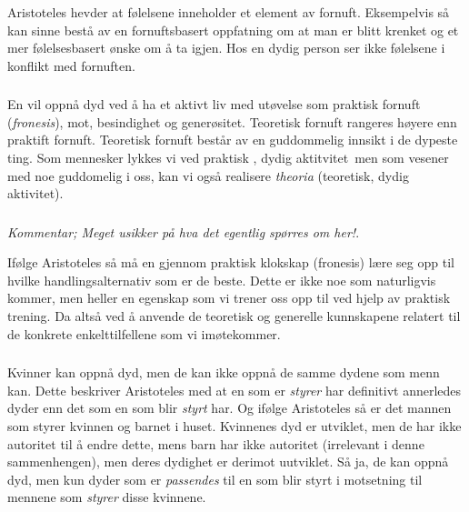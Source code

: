 \documentclass[a4paper]{IEEEtran}
\begin{document}
        \subsubsection{}
        Aristoteles hevder at følelsene inneholder et element av fornuft. 
        Eksempelvis så kan sinne bestå av en fornuftsbasert oppfatning om at
        man er blitt krenket og et mer følelsesbasert ønske om å ta igjen.
        Hos en dydig person ser ikke følelsene i konflikt med fornuften.
        \cite{rephefte_aristoteles} \medskip

        \subsubsection{}
        En vil oppnå dyd ved å ha et aktivt liv med utøvelse som praktisk fornuft
        (\textit{fronesis}), mot, besindighet og generøsitet. Teoretisk fornuft
        rangeres høyere enn praktift fornuft. Teoretisk fornuft består 
        av en guddommelig innsikt i de dypeste ting. Som mennesker 
        lykkes vi ved praktisk , dydig aktitvitet men som vesener med 
        noe guddomelig i oss, kan vi også realisere \textit{theoria}
        (teoretisk, dydig aktivitet).\cite{snl_aristoteles} \medskip

        \subsubsection{}
        \textit{Kommentar; Meget usikker på hva det egentlig spørres om her!}.

        Ifølge Aristoteles så må en gjennom praktisk klokskap (fronesis) lære 
        seg opp til hvilke handlingsalternativ som er de beste. Dette 
        er ikke noe som naturligvis kommer, men heller en egenskap som vi trener 
        oss opp til ved hjelp av praktisk trening. Da altså ved å anvende 
        de teoretisk og generelle kunnskapene relatert til de konkrete 
        enkelttilfellene som vi imøtekommer. \medskip 

        \subsubsection{}
        Kvinner kan oppnå dyd, men de kan ikke oppnå de samme dydene som menn kan. 
        Dette beskriver Aristoteles med at en som er \textit{styrer} har definitivt 
        annerledes dyder enn det som en som blir \textit{styrt} har. Og ifølge 
        Aristoteles så er det mannen som styrer kvinnen og barnet i huset. 
        Kvinnenes dyd er utviklet, men de har ikke autoritet til å endre dette, 
        mens barn har ikke autoritet (irrelevant i denne sammenhengen), men deres 
        dydighet er derimot uutviklet. Så ja, de kan oppnå dyd, men kun dyder som 
        er \textit{passendes} til en som blir styrt i motsetning til mennene som
        \textit{styrer} disse kvinnene.
\end{document}
